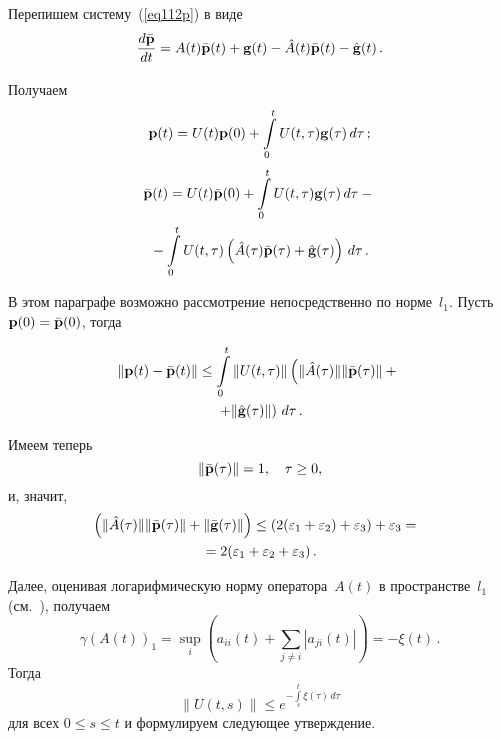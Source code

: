 \begin{multicols}{2}
Перепишем систему~(\ref{eq112p}) в виде
\begin{equation*}
\displaystyle\frac{\displaystyle d\bar{\bf p}\mathstrut}{\displaystyle dt\mathstrut}=A(t)\bar{\bf p}(t) + {\bf g}(t)-\hat{A}(t)\bar{\bf p}(t)-\hat{ \bf g}(t)\,.
\end{equation*}

Получаем
\begin{equation*}
{\mathbf p}(t)=U(t){\mathbf p}(0)+\int\limits_0^t U(t,\tau){\mathbf g}(\tau) \, d\tau\,;
\end{equation*}
\begin{multline*}
\bar{{\mathbf p}}(t)=U(t)\bar{{\mathbf p}}(0)+\int\limits_0^t U(t,\tau){\mathbf g}(\tau) \, d\tau-{}\\
{}-\int\limits_0^t U(t,\tau)
\left(\hat{A}(\tau)\bar{\mathbf p}(\tau) + \hat{\mathbf g}(\tau)\right)\, d\tau\,.
\end{multline*}

В этом параграфе возможно рассмотрение непосредственно по норме~$l_1$.
Пусть ${\mathbf p}(0)=\bar{{\mathbf p}}(0)$, тогда

\vspace*{-6pt}

\noindent
\begin{multline*}
\left\|{\mathbf p}(t)-\bar{{\mathbf p}}(t)\right\|\le \int\limits_0^t \|U(t,\tau)\|
\left(\|\hat{A}(\tau)\|\|\bar{\bf p}(\tau)\| +{}\right.\\
{}\left.+ \|\hat{\bf g}(\tau)\|\right)\, d\tau\,.
\end{multline*}

Имеем теперь
\begin{equation}
\|\bar{\bf p}(\tau)\| =1, \quad \tau \ge 0,
\label{p0}
\end{equation}
и, значит,
\begin{multline*}
\!\!\left(\|\hat{A}(\tau)\|\|\bar{\bf p}(\tau)\| + \|\bar{\bf g}(\tau)\|\right)\le
(2(\varepsilon_1+\varepsilon_2)+\varepsilon_3)+\varepsilon_3 ={}\\
{}= 2(\varepsilon_1+\varepsilon_2+\varepsilon_3)\,.
\end{multline*}

Далее, оценивая логарифмическую норму оператора~$A(t)$ в пространстве~$l_1$ (см.~\cite{z09a}), получаем
\begin{equation*}
\gamma \left(A(t)\right)_{1} = \sup_i \left(a_{ii}(t) + \sum_{j\neq
i} |a_{ji}(t)|\right) = -\xi(t)\,.
\end{equation*}
Тогда
\begin{equation*}
\|U(t,s)\| \le  e^{-\int\limits_s^t \xi(\tau)\, d\tau}
\end{equation*}
для всех $0 \le s \le t$ и формулируем следующее утверждение.


\end{multicols}
